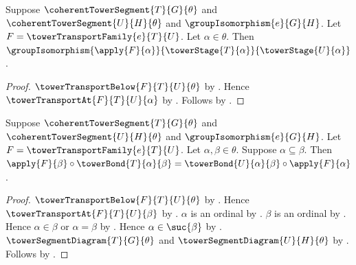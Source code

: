 \begin{theorem}\label{coherent_tower_transport_component}
    Suppose $\coherentTowerSegment{T}{G}{\theta}$ and
        $\coherentTowerSegment{U}{H}{\theta}$ and
        $\groupIsomorphism{e}{G}{H}$.
    Let $F=\towerTransportFamily{e}{T}{U}$.
    Let $\alpha\in\theta$.
    Then $\groupIsomorphism{\apply{F}{\alpha}}
        {\towerStage{T}{\alpha}}{\towerStage{U}{\alpha}}$.
\end{theorem}
\begin{proof}
    $\towerTransportBelow{F}{T}{U}{\theta}$ by
        .
    Hence $\towerTransportAt{F}{T}{U}{\alpha}$ by
        .
    Follows by .
\end{proof}

\begin{theorem}\label{coherent_tower_transport_square}
    Suppose $\coherentTowerSegment{T}{G}{\theta}$ and
        $\coherentTowerSegment{U}{H}{\theta}$ and
        $\groupIsomorphism{e}{G}{H}$.
    Let $F=\towerTransportFamily{e}{T}{U}$.
    Let $\alpha,\beta\in\theta$.
    Suppose $\alpha\subseteq\beta$.
    Then $\apply{F}{\beta}\circ\towerBond{T}{\alpha}{\beta}=
        \towerBond{U}{\alpha}{\beta}\circ\apply{F}{\alpha}$.
\end{theorem}
\begin{proof}
    $\towerTransportBelow{F}{T}{U}{\theta}$ by
        .
    Hence $\towerTransportAt{F}{T}{U}{\beta}$ by
        .
    $\alpha$ is an ordinal by
        .
    $\beta$ is an ordinal by
        .
    Hence $\alpha\in\beta$ or $\alpha=\beta$ by
        .
    Hence $\alpha\in\suc{\beta}$ by .
    $\towerSegmentDiagram{T}{G}{\theta}$ and
        $\towerSegmentDiagram{U}{H}{\theta}$ by
        .
    Follows by .
\end{proof}

